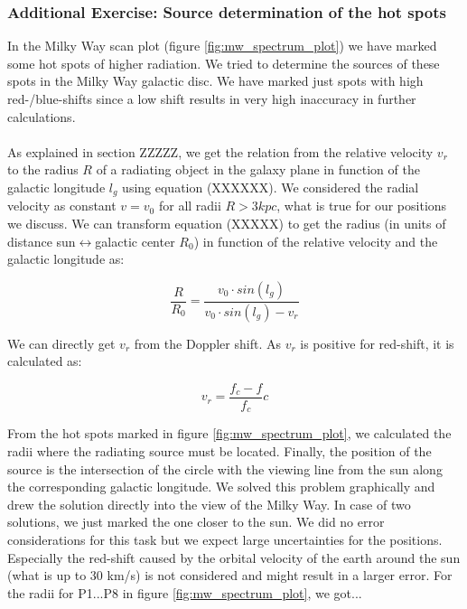 \subsubsection{Additional Exercise: Source determination of the hot spots}\label{sec:HotSpots}
In the Milky Way scan plot (figure \ref{fig:mw_spectrum_plot}) we have marked some hot spots of higher radiation. We tried to determine the sources of these spots in the Milky Way galactic disc. We have marked just spots with high red-/blue-shifts since a low shift results in very high inaccuracy in further calculations. \\
 \\
As explained in section ZZZZZ, we get the relation from the relative velocity $v_r$ to the radius $R$ of a radiating object in the galaxy plane in function of the galactic longitude $l_g$ using equation (XXXXXX). We considered the radial velocity as constant $v = v_0$ for all radii $R > 3kpc$, what is true for our positions we discuss. We can transform equation (XXXXX) to get the radius (in units of distance sun$\leftrightarrow$galactic center $R_0$) in function of the relative velocity and the galactic longitude as:

\begin{equation}
	\frac{R}{R_0}=\frac{v_0\cdot sin(l_g)}{v_0\cdot sin(l_g)-v_r}
\end{equation}

We can directly get $v_r$ from the Doppler shift. As $v_r$ is positive for red-shift, it is calculated as:

\begin{equation}
	v_r = \frac{f_c-f}{f_c} c
\end{equation}

From the hot spots marked in figure \ref{fig:mw_spectrum_plot}, we calculated the radii where the radiating source must be located. Finally, the position of the source is the intersection of the circle with the viewing line from the sun along the corresponding galactic longitude. We solved this problem graphically and drew the solution directly into the view of the Milky Way. In case of two solutions, we just marked the one closer to the sun. We did no error considerations for this task but we expect large uncertainties for the positions. Especially the red-shift caused by the orbital velocity of the earth around the sun (what is up to 30 km/s) is not considered and might result in a larger error. For the radii for P1...P8 in figure \ref{fig:mw_spectrum_plot}, we got...

